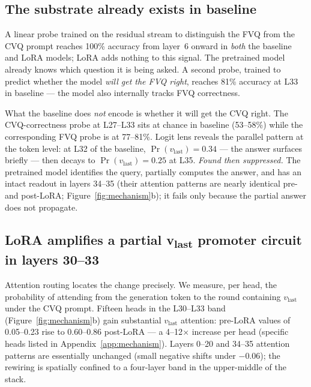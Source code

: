 \subsection{The substrate already exists in baseline}
\label{sec:mechanism:substrate}

A linear probe trained on the residual stream to distinguish the FVQ
from the CVQ prompt reaches 100\% accuracy from layer~6 onward in
\emph{both} the baseline and LoRA models; LoRA adds nothing to this
signal. The pretrained model already knows which question it is being
asked. A second probe, trained to predict whether the model
\emph{will get the FVQ right}, reaches 81\% accuracy at L33 in baseline ---
the model also internally tracks FVQ correctness.

What the baseline does \emph{not} encode is whether it will get the
CVQ right. The CVQ-correctness probe at L27--L33 sits at chance in
baseline (53--58\%) while the corresponding FVQ probe is at 77--81\%.
Logit lens reveals the parallel pattern at the token level: at L32 of
the baseline, $\Pr(v_{\text{last}}){=}0.34$ --- the answer surfaces
briefly --- then decays to $\Pr(v_{\text{last}}){=}0.25$ at L35.
\emph{Found then suppressed.} The pretrained model identifies the
query, partially computes the answer, and has an intact readout in
layers 34--35 (their attention patterns are nearly identical pre- and
post-LoRA; Figure~\ref{fig:mechanism}b); it fails only because the
partial answer does not propagate.

\subsection{LoRA amplifies a partial v\textsubscript{last} promoter
circuit in layers 30--33}
\label{sec:mechanism:promoter}

Attention routing locates the change precisely. We measure, per head,
the probability of attending from the generation token to the round
containing $v_{\text{last}}$ under the CVQ prompt. Fifteen heads in the
L30--L33 band (Figure~\ref{fig:mechanism}b) gain substantial
$v_{\text{last}}$ attention: pre-LoRA values of 0.05--0.23 rise to
0.60--0.86 post-LoRA --- a 4--12$\times$ increase per head (specific
heads listed in Appendix~\ref{app:mechanism}). Layers 0--20 and 34--35
attention patterns are essentially unchanged (small negative shifts
under $-0.06$); the rewiring is spatially confined to a four-layer
band in the upper-middle of the stack.

